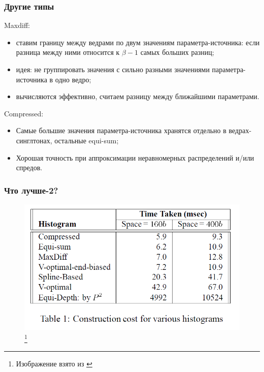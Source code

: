 \documentclass{beamer}
\begin{document}
\begin{frame}
\frametitle{Другие типы}
Maxdiff:
\begin{itemize}
  \item ставим границу между ведрами по двум значениям параметра-источника: если разница между ними относится к $\beta - 1$ самых больших разниц;
  \item идея: не группировать значения с сильно разными значениями параметра-источника в одно ведро;
  \item вычисляются эффективно, считаем разницу между ближайшими параметрами.
\end{itemize}

Compressed:
\begin{itemize}
  \item Самые большие значения параметра-источника хранятся отдельно в ведрах-синглтонах, остальные equi-sum;
  \item Хорошая точность при аппроксимации неравномерных распределений и/или спредов.
\end{itemize}

\end{frame}


\begin{frame}
\frametitle{Что лучше-2?}

\begin{figure}[htb]
\includegraphics[width=\textwidth,height=0.65\textheight,keepaspectratio]{test-2.png} 
\footnote{\tiny{Изображение взято из \cite{Poosala1996}}}
\end{figure}

\end{frame}
\end{document}
